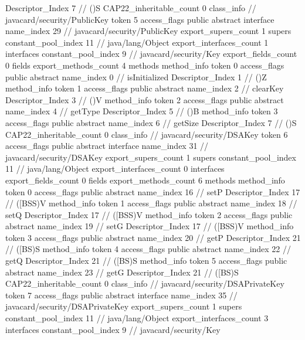 {{{{{					Descriptor_Index	7		// ()S
				}
			}
			CAP22_inheritable_count	0
		}
		class_info {		// javacard/security/PublicKey
			token	5
			access_flags	public abstract interface
			name_index	29		// javacard/security/PublicKey
			export_supers_count	1
			supers {
				constant_pool_index	11		// java/lang/Object
			}
			export_interfaces_count	1
			interfaces {
				constant_pool_index	9		// javacard/security/Key
			}
			export_fields_count	0
			fields {
			}
			export_methods_count	4
			methods {
				method_info {
					token	0
					access_flags	public abstract
					name_index	0		// isInitialized
					Descriptor_Index	1		// ()Z
				}
				method_info {
					token	1
					access_flags	public abstract
					name_index	2		// clearKey
					Descriptor_Index	3		// ()V
				}
				method_info {
					token	2
					access_flags	public abstract
					name_index	4		// getType
					Descriptor_Index	5		// ()B
				}
				method_info {
					token	3
					access_flags	public abstract
					name_index	6		// getSize
					Descriptor_Index	7		// ()S
				}
			}
			CAP22_inheritable_count	0
		}
		class_info {		// javacard/security/DSAKey
			token	6
			access_flags	public abstract interface
			name_index	31		// javacard/security/DSAKey
			export_supers_count	1
			supers {
				constant_pool_index	11		// java/lang/Object
			}
			export_interfaces_count	0
			interfaces {
			}
			export_fields_count	0
			fields {
			}
			export_methods_count	6
			methods {
				method_info {
					token	0
					access_flags	public abstract
					name_index	16		// setP
					Descriptor_Index	17		// ([BSS)V
				}
				method_info {
					token	1
					access_flags	public abstract
					name_index	18		// setQ
					Descriptor_Index	17		// ([BSS)V
				}
				method_info {
					token	2
					access_flags	public abstract
					name_index	19		// setG
					Descriptor_Index	17		// ([BSS)V
				}
				method_info {
					token	3
					access_flags	public abstract
					name_index	20		// getP
					Descriptor_Index	21		// ([BS)S
				}
				method_info {
					token	4
					access_flags	public abstract
					name_index	22		// getQ
					Descriptor_Index	21		// ([BS)S
				}
				method_info {
					token	5
					access_flags	public abstract
					name_index	23		// getG
					Descriptor_Index	21		// ([BS)S
				}
			}
			CAP22_inheritable_count	0
		}
		class_info {		// javacard/security/DSAPrivateKey
			token	7
			access_flags	public abstract interface
			name_index	35		// javacard/security/DSAPrivateKey
			export_supers_count	1
			supers {
				constant_pool_index	11		// java/lang/Object
			}
			export_interfaces_count	3
			interfaces {
				constant_pool_index	9		// javacard/security/Key
}}}}
